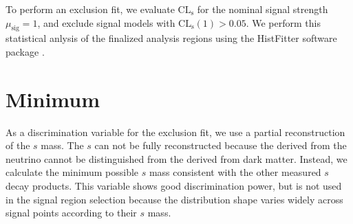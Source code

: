 To perform an exclusion fit, we evaluate $\text{CL}_\text{s}$ for the nominal signal strength $\mu_{\text{sig}} = 1$, and exclude signal models with $\text{CL}_\text{s}(1) > 0.05$. We perform this statistical anlysis of the finalized analysis regions using the HistFitter software package \cite{HistFitter}.

\section{Minimum \ms}
As a discrimination variable for the exclusion fit, we use a partial reconstruction of the $s$ mass. The $s$ can not be fully reconstructed because the \met derived from the neutrino cannot be distinguished from the \met derived from dark matter. Instead, we calculate the minimum possible $s$ mass \minms consistent with the other measured $s$ decay products. This variable shows good discrimination power, but is not used in the signal region selection because the distribution shape varies widely across signal points according to their $s$ mass.


